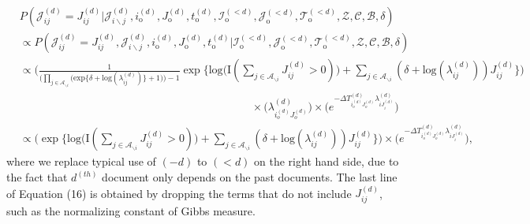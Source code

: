 \documentclass[a4paper]{article}
\begin{document}
   \begin{equation}
   \begin{aligned}
   &P(\mathcal{J}^{(d)}_{ij} = {J}^{(d)}_{ij}|\mathcal{J}^{(d)}_{i\backslash j}, i^{(d)}_{\mbox{o}}, J^{(d)}_{\mbox{o}}, t^{(d)}_{\mbox{o}}, \mathcal{I}^{(<d)}_{\mbox{o}}, \mathcal{J}^{(<d)}_{\mbox{o}}, \mathcal{T}^{(<d)}_{\mbox{o}}, \mathcal{Z}, \mathcal{C}, \mathcal{B}, \delta)\\&\propto P(\mathcal{J}^{(d)}_{ij} ={J}^{(d)}_{ij}, \mathcal{J}^{(d)}_{i\backslash j}, i^{(d)}_{\mbox{o}}, J^{(d)}_{\mbox{o}}, t^{(d)}_{\mbox{o}}| \mathcal{I}^{(<d)}_{\mbox{o}}, \mathcal{J}^{(<d)}_{\mbox{o}}, \mathcal{T}^{(<d)}_{\mbox{o}}, \mathcal{Z}, \mathcal{C}, \mathcal{B}, \delta)
   \\&\propto\Big( \frac{1}{\Big(\prod_{j \in \mathcal{A}_{\backslash i}} \Big(\mbox{exp}\{\delta+\mbox{log}(\lambda_{ij}^{(d)})\} + 1\Big)\Big)-1}\exp\Big\{\mbox{log}\big(\text{I}( \sum_{j \in \mathcal{A}_{\backslash i}} J^{(d)}_{ij} > 0 )\big) +\sum_{j \in \mathcal{A}_{\backslash i}} (\delta+\mbox{log}(\lambda_{ij}^{(d)}))J_{ij}^{(d)} \Big\}\Big)\\&\quad\quad\quad\quad\quad\quad\quad\quad\quad\quad\quad\quad\quad\quad\quad\quad\quad\quad\quad\quad\quad\times \Big(\lambda^{(d)}_{i_o^{(d)}J_{o}^{(d)}}\Big)\times \Big(e^{-\Delta T^{(d)}_{i_o^{(d)}J_o^{(d)}}\lambda^{(d)}_{iJ^{(d)}_{i}}}\Big)
   \\& \propto \Big(\exp\Big\{\mbox{log}\big(\text{I}( \sum_{j \in \mathcal{A}_{\backslash i}} J^{(d)}_{ij} > 0 )\big) +\sum_{j \in \mathcal{A}_{\backslash i}} (\delta+\mbox{log}(\lambda_{ij}^{(d)}))J_{ij}^{(d)} \Big\}\Big)\times \Big(e^{-\Delta T^{(d)}_{i_o^{(d)}J_o^{(d)}}\lambda^{(d)}_{iJ^{(d)}_{i}}}\Big),
   \end{aligned}
   \end{equation}
   where we replace typical use of $(-d)$ to $(<d)$ on the right hand side, due to the fact that $d^{(th)}$ document only depends on the past documents. The last line of Equation (16) is obtained by dropping the terms that do not include $J^{(d)}_{ij}$, such as the normalizing constant of Gibbs measure. 
   
\end{document}
